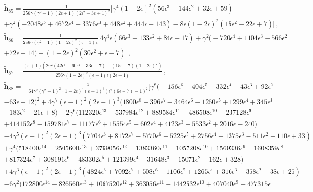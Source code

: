 \begin{align}
    \begin{split}
    &\boldsymbol{\tilde h}_{85}=\frac{1}{256 \gamma  \left(\gamma ^2-1\right) (2 \epsilon +1) \left(2 \epsilon ^2-3 \epsilon +1\right)^2}\Bigg[\gamma ^4 (1-2 \epsilon )^2 \left(56 \epsilon ^3-144 \epsilon ^2+32 \epsilon +59\right)\\&+\gamma ^2 \left(-2048 \epsilon ^5+4672 \epsilon ^4-3376 \epsilon ^3+448 \epsilon ^2+444 \epsilon -143\right)-8 \epsilon  (1-2 \epsilon )^2 \left(15 \epsilon ^2-22 \epsilon +7\right)\Bigg]\,,\\&\boldsymbol{\tilde h}_{86}=\frac{1}{256 \gamma  \left(\gamma ^2-1\right) (1-2 \epsilon )^2 (\epsilon -1) \epsilon}\Bigg[4 \gamma ^4 \epsilon  \left(66 \epsilon ^3-133 \epsilon ^2+84 \epsilon -17\right)+\gamma ^2 \big(-720 \epsilon ^4+1104 \epsilon ^3-566 \epsilon ^2\\&+72 \epsilon +14\big)-(1-2 \epsilon )^2 \left(30 \epsilon ^2+\epsilon -7\right)\Bigg]\,,\\&\boldsymbol{\tilde h}_{87}=\frac{(\epsilon +1) \left(2 \gamma ^2 \left(42 \epsilon ^3-60 \epsilon ^2+33 \epsilon -7\right)+(15 \epsilon -7) (1-2 \epsilon )^2\right)}{256 \gamma  (1-2 \epsilon )^2 (\epsilon -1) \epsilon  (2 \epsilon +1)}\,,\\&\boldsymbol{\tilde h}_{88}=-\frac{1}{64 \gamma ^2 \left(\gamma ^2-1\right)^2 (1-2 \epsilon )^4 (\epsilon -1)^3 \left(\epsilon ^2 (6 \epsilon +7)-1\right)^2}\Bigg[\gamma ^8 \big(-156 \epsilon ^6+404 \epsilon ^5-332 \epsilon ^4+43 \epsilon ^3+92 \epsilon ^2\\&-63 \epsilon +12\big)^2+4 \gamma ^7 (\epsilon -1)^2 (2 \epsilon -1)^3 \big(1800 \epsilon ^8+396 \epsilon ^7-3464 \epsilon ^6-1260 \epsilon ^5+1299 \epsilon ^4+345 \epsilon ^3\\&-183 \epsilon ^2-21 \epsilon +8\big)+2 \gamma ^6 \big(112320 \epsilon ^{13}-537984 \epsilon ^{12}+889584 \epsilon ^{11}-486508 \epsilon ^{10}-237128 \epsilon ^9\\&+414152 \epsilon ^8-159781 \epsilon ^7-11177 \epsilon ^6+15554 \epsilon ^5+602 \epsilon ^4+4123 \epsilon ^3-5533 \epsilon ^2+2016 \epsilon -240\big)\\&-4 \gamma ^5 (\epsilon -1)^2 (2 \epsilon -1)^3 \left(7704 \epsilon ^8+8172 \epsilon ^7-5770 \epsilon ^6-5225 \epsilon ^5+2756 \epsilon ^4+1375 \epsilon ^3-511 \epsilon ^2-110 \epsilon +33\right)\\&+\gamma ^4 \big(518400 \epsilon ^{14}-2505600 \epsilon ^{13}+3769056 \epsilon ^{12}-1383360 \epsilon ^{11}-1057208 \epsilon ^{10}+1569336 \epsilon ^9-1608359 \epsilon ^8\\&+817324 \epsilon ^7+308191 \epsilon ^6-483302 \epsilon ^5+121399 \epsilon ^4+31648 \epsilon ^3-15071 \epsilon ^2+162 \epsilon +328\big)\\&+4 \gamma ^3 (\epsilon -1)^2 (2 \epsilon -1)^3 \left(4824 \epsilon ^8+7092 \epsilon ^7+508 \epsilon ^6-1106 \epsilon ^5+1265 \epsilon ^4+316 \epsilon ^3-358 \epsilon ^2-38 \epsilon +25\right)\\&-6 \gamma ^2 \big(172800 \epsilon ^{14}-826560 \epsilon ^{13}+1067520 \epsilon ^{12}+363056 \epsilon ^{11}-1442532 \epsilon ^{10}+407040 \epsilon ^9+477315 \epsilon 
\end{split}
\end{align}
